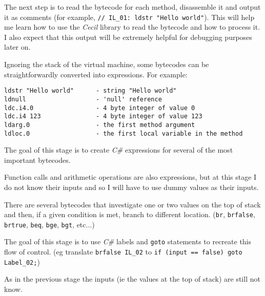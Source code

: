 \documentclass[12pt]{article}
\begin{document}
\begin{enumerate}
The next step is to read the bytecode for each method, disassemble it and 
output it as comments (for example, \verb|// IL_01: ldstr "Hello world"|).  
This will help me learn how to use the \emph{Cecil} library to read the 
bytecode and how to process it.  I also expect that this output will be 
extremely helpful for debugging purposes later on.

Ignoring the stack of the virtual machine, some bytecodes can be 
straightforwardly converted into expressions.  For example:
\begin{verbatim}
ldstr "Hello world"      - string "Hello world"
ldnull                   - 'null' reference
ldc.i4.0                 - 4 byte integer of value 0
ldc.i4 123               - 4 byte integer of value 123
ldarg.0                  - the first method argument
ldloc.0                  - the first local variable in the method
\end{verbatim}

The goal of this stage is to create \emph{C\#} expressions for several of 
the most important bytecodes.

Function calls and arithmetic operations are also expressions, but at this 
stage I do not know their inputs and so I will have to use dummy values as 
their inputs.

There are several bytecodes that investigate one or two values on the top 
of stack and then, if a given condition is met, branch to different 
location.  (\verb|br|, \verb|brfalse|, \verb|brtrue|, \verb|beq|, 
\verb|bge|, \verb|bgt|, etc...)

The goal of this stage is to use \emph{C\#} labels and \verb|goto|
statements to recreate this flow of control.  (eg translate 
\verb|brfalse IL_02| to \verb|if (input == false) goto Label_02;|)

As in the previous stage the inputs (ie the values at the top of stack) are
still not know.


\end{enumerate}
\end{document}
